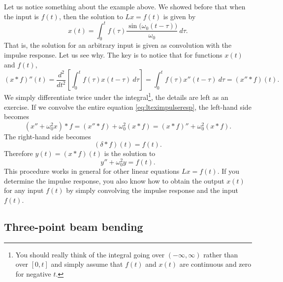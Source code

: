 \documentclass{ximera}
\begin{document}
Let us notice something about the example above.  We showed before that when the input is $f(t)$, then the solution to $Lx = f(t)$ is given by
\begin{equation*}
    x(t) =  \int_0^t f(\tau) \frac{\sin \bigl( \omega_0 (t-\tau) \bigr)}{\omega_0} ~ d\tau .
\end{equation*}
That is, the solution for an arbitrary input is given as convolution with the impulse response.  Let us see why. The key is to notice that for functions $x(t)$ and $f(t)$,
\begin{equation*}
    (x * f)''(t) = \frac{d^2}{dt^2}\left[ \int_0^t f(\tau) x(t-\tau) ~ d\tau \right] = \int_0^t f(\tau) x''(t-\tau) ~ d\tau = (x'' * f)(t) .
\end{equation*}
We simply differentiate twice under the integral\footnote{You should really think of the integral going over $(-\infty,\infty)$ rather than over $[0,t]$ and simply assume that $f(t)$ and $x(t)$ are continuous and zero for negative $t$.}, the details are left as an exercise. If we convolve the entire equation \eqref{eq:lteximpulseresp}, the left-hand side becomes
\begin{equation*}
    (x'' + \omega_0^2 x) * f = (x'' * f) + \omega_0^2 (x * f) = (x * f)'' + \omega_0^2 (x * f) .
\end{equation*}
The right-hand side becomes
\begin{equation*}
    (\delta * f)(t) = f(t).
\end{equation*}
Therefore $y(t) = (x * f)(t)$ is the solution to
\begin{equation*}
    y'' + \omega_0^2 y = f(t) .
\end{equation*}
This procedure works in general for other linear equations $Lx = f(t)$.  If you determine the impulse response, you also know how to obtain the output $x(t)$ for any input $f(t)$ by simply convolving the impulse response and the input $f(t)$.

\subsection{Three-point beam bending}
\end{document}
